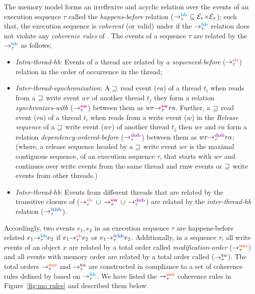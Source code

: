The \cc memory model forms an irreflexive and acyclic relation over the events of 
an execution sequence $\tau$ called the {\em happens-before} relation 
($\setHB \subseteq \events_\tau {\times} \events_\tau$);
such that, the execution sequence is {\em coherent} (or valid) under \cc if 
the $\setHB$ relation does not violate any {\em coherence rules} of \cc.
%
The events of a sequence $\tau$ are related by the $\setHB$ as follows;
\begin{itemize}
	\item {\em Intra-thread-hb}: Events of a thread are related by a {\em sequenced-before}
	($\setSB$) relation in the order of occurrence in the thread;
	
	\item {\em Inter-thread-synchronization}: A ${\sqsupseteq}$ \acq read event ($ra$) of a thread 
	$t_i$ when reads from a ${\sqsupseteq}$ \rel write event $wr$ of another thread $t_j$ they form a
	relation {\em synchronizes-with} ($\setSW$) between them as $\sw{\tau}{wr}{ra}$.
	Further, a ${\sqsupseteq}$ \acq read event ($ra$) of a thread $t_i$ when reads from a write 
	event ($w$) in the {\em Release sequence} \cite{C11} of a ${\sqsupseteq}$ \rel write event ($wr$) of 
	another thread $t_j$ then $wr$ and $ra$ form a relation {\em dependency-ordered-before}
	($\setDOB$) between them as $\dob{\tau}{wr}{ra}$;
	(where, a release sequence headed by a ${\sqsupseteq}$ \rel write event $wr$ is the maximal 
	contiguous sequence, of an execution sequence $\tau$, that starts with $wr$ and continues 
	over write events from the same thread and rmw events or ${\sqsupseteq}$ \rel write events from
	other threads.)
	
	\item {\em Inter-thread-hb}: Events from different threads that are related by the 
	transitive closure of ($\setSB$ $\cup$ $\setSW$ $\cup$ $\setDOB$) are related by 
	the {\em inter-thread-hb} relation ($\setITHB$). 
\end{itemize}

Accordingly, two events $e_1,e_2$ in an execution sequence $\tau$ are happens-before 
related \ie
$\hb{\tau}{e_1}{e_2}$ if $\seqb{\tau}{e_1}{e_2}$ or $\ithb{\tau}{e_1}{e_2}$.
%
Additionally, in a sequence $\tau$, all write events of an object $x$ are related by a 
total order called {\em modification-order} ($\setMO$) and all events with memory
order \sc are related by a total order called  ($\setTO$).
%
The total orders $\setMO$ and $\setTO$ are constructed in compliance to a set of coherence
rules defined by \cc based on $\setHB$. 
%
We have listed the $\setMO$ coherence rules in Figure~\ref{fig:mo rules} and 
described them below.

